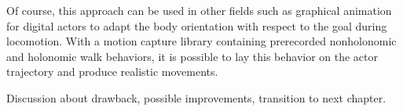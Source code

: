 Of course, this approach can be used in other fields such as graphical
animation for digital actors to adapt the body orientation with respect
to the goal during locomotion. With a motion capture library
containing prerecorded nonholonomic and holonomic walk behaviors, it
is possible to lay this behavior on the actor trajectory and produce
realistic movements.

Discussion about drawback, possible improvements, transition to next
chapter.
